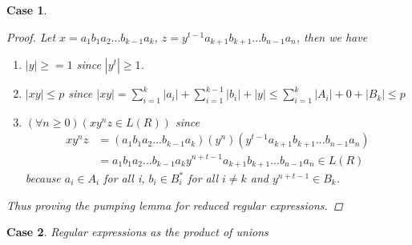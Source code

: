 \documentclass[11pt]{article}
\newtheorem{case}{Case}
\theoremstyle{definition}
\begin{document}
\begin{case}
\begin{proof}
Let $x = a_1b_1a_2 ... b_{k-1}a_k$, $z = y^{t-1}a_{k+1}b_{k+1}...b_{n-1}a_n$, then we have
\begin{enumerate}
    \item[-] $|y| \geq = 1$ since $|y^t| \geq 1$.
    \item[-] $|xy|\leq p$ since $|xy| = \sum_{i=1}^{k}|a_i| + \sum_{i=1}^{k-1}|b_i| + |y| \leq \sum_{i=1}^{k}|A_i| + 0 + |B_k| \leq p$
    \item[-] $(\forall n\geq 0)(xy^nz\in L(R))$ since 
    \begin{align*}
        xy^nz &= (a_1b_1a_2 ... b_{k-1}a_k)(y^n)(y^{t-1}a_{k+1}b_{k+1}...b_{n-1}a_n)\\
        &= a_1b_1a_2 ... b_{k-1}a_ky^{n +t-1}a_{k+1}b_{k+1}...b_{n-1}a_n \in L(R)
    \end{align*}
    because $a_i\in A_i$ for all i, $b_i \in B_i^*$ for all $i \neq k$ and $y^{n +t-1} \in B_k$.
\end{enumerate}
Thus proving the pumping lemma for reduced regular expressions.
\end{proof}
\end{case}

\begin{case}
Regular expressions as the product of unions
\end{case}
\end{document}
